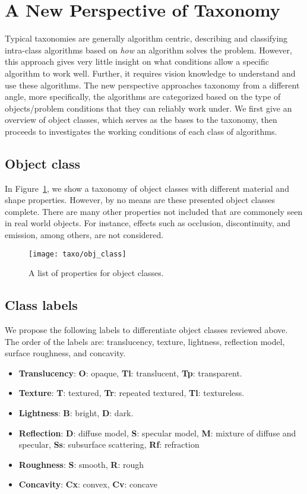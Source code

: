 \section{A New Perspective of Taxonomy}
Typical taxonomies are generally algorithm centric, describing and classifying intra-class algorithms based on \textit{how} an algorithm solves the problem. However, this approach gives very little insight on what conditions allow a specific algorithm to work well. Further, it requires vision knowledge to understand and use these algorithms. The new perspective approaches taxonomy from a different angle, more specifically, the algorithms are categorized based on the type of objects/problem conditions that they can reliably work under. We first give an overview of object classes, which serves as the bases to the taxonomy, then proceeds to investigates the working conditions of each class of algorithms.

\subsection{Object class}
In Figure~\ref{fig:obj_class}, we show a taxonomy of object classes with different material and shape properties. However, by no means are these presented object classes complete. There are many other properties not included that are commonely seen in real world objects. For instance, effects such as occlusion, discontinuity, and emission, among others, are not considered.
\begin{figure}[!htbp]
\centering
\texttt{[image: taxo/obj\_class]}\\
\caption{A list of properties for object classes.}
\label{fig:obj_class}
\end{figure}

\subsection{Class labels}
We propose the following labels to differentiate object classes reviewed above. The order of the labels are: translucency, texture, lightness, reflection model, surface roughness, and concavity.
\begin{itemize}
\item \textbf{Translucency}: \textbf{O}: opaque, \textbf{Tl}: translucent, \textbf{Tp}: transparent.
\item \textbf{Texture}: \textbf{T}: textured, \textbf{Tr}: repeated textured, \textbf{Tl}: textureless.
\item \textbf{Lightness}: \textbf{B}: bright, \textbf{D}: dark.
\item \textbf{Reflection}: \textbf{D}: diffuse model, \textbf{S}: specular model, \textbf{M}: mixture of diffuse and specular, \textbf{Ss}: subsurface scattering, \textbf{Rf}: refraction
\item \textbf{Roughness}: \textbf{S}: smooth, \textbf{R}: rough
\item \textbf{Concavity}: \textbf{Cx}: convex, \textbf{Cv}: concave
\end{itemize}

